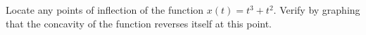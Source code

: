 Locate any points of inflection of the function $x(t)=t^3+t^2$. Verify by graphing that the concavity
of the function reverses itself at this point.
